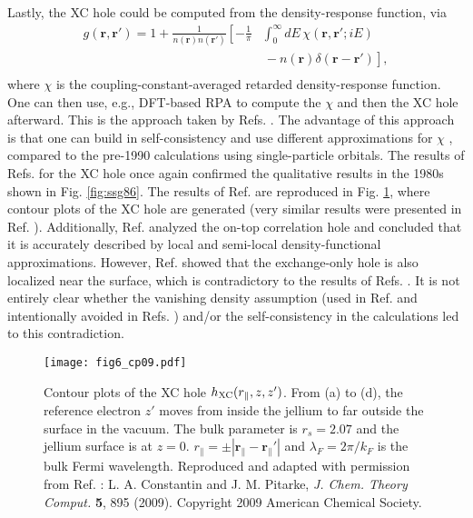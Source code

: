 \documentclass[aip, amsmath, amssymb, reprint, longbibliography]{revtex4-2}
\def\mr{\mathbf{r}}
\begin{document}
Lastly, the XC hole could be computed from the density-response function, via \cite{NP01}
\begin{equation}
\begin{split}
g(\mathbf{r},\mathbf{r}')=1+\frac{1}{n(\mr)n(\mr')}\left[-\frac{1}{\pi} \right. & \int_0^\infty dE \, \chi(\mr,\mr';iE) \\ 
& \left. \frac{}{} -n(\mr)\delta(\mr-\mr')\right], \\
\end{split}
\label{eq:holeinchi}
\end{equation}
where $\chi$ is the coupling-constant-averaged retarded density-response function. One can then use, e.g., DFT-based RPA to compute the $\chi$ and then the XC hole afterward. This is the approach taken by Refs. . The advantage of this approach is that one can build in self-consistency \cite{PE98,PE01} and use different approximations for $\chi$ \cite{CP09}, compared to the pre-1990 calculations using single-particle orbitals. The results of Refs.  for the XC hole once again confirmed the qualitative results in the 1980s shown in Fig. \ref{fig:ssg86}. The results of Ref.  are reproduced in Fig. \ref{fig:cp09}, where contour plots of the XC hole are generated (very similar results were presented in Ref. ). Additionally, Ref.  analyzed the on-top correlation hole and concluded that it is accurately described by local and semi-local density-functional approximations. However, Ref.  showed that the exchange-only hole is also localized near the surface, which is contradictory to the results of Refs. . It is not entirely clear whether the vanishing density assumption (used in Ref.  and intentionally avoided in Refs. ) and/or the self-consistency in the calculations led to this contradiction.

\begin{figure}[htp]
\centering
\texttt{[image: fig6\_cp09.pdf]}
\caption{Contour plots of the XC hole $h_{\rm XC}(r_\parallel,z,z')$. From (a) to (d), the reference electron $z'$ moves from inside the jellium to far outside the surface in the vacuum. The bulk parameter is $r_s=2.07$ and the jellium surface is at $z=0$. $r_\parallel=\pm|\mr_\parallel-\mr_\parallel'|$ and $\lambda_F=2\pi/k_F$ is the bulk Fermi wavelength. Reproduced and adapted with
permission from Ref. : L. A. Constantin and J. M. Pitarke, \emph{J. Chem. Theory Comput.} \textbf{5}, 895 (2009). Copyright 2009 American Chemical Society.}
\label{fig:cp09}
\end{figure}
\end{document}
